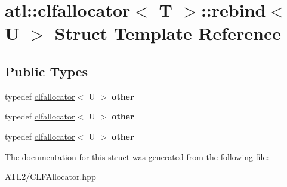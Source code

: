 \hypertarget{structatl_1_1clfallocator_1_1rebind}{\section{atl\+:\+:clfallocator$<$ T $>$\+:\+:rebind$<$ U $>$ Struct Template Reference}
\label{structatl_1_1clfallocator_1_1rebind}
}
\subsection*{Public Types}
\begin{DoxyCompactItemize}
\item 
\hypertarget{structatl_1_1clfallocator_1_1rebind_a52f6f39a2160324b3f2dc0caf40766e2}{typedef \hyperlink{structatl_1_1clfallocator}{clfallocator}$<$ U $>$ {\bfseries other}}\label{structatl_1_1clfallocator_1_1rebind_a52f6f39a2160324b3f2dc0caf40766e2}

\item 
\hypertarget{structatl_1_1clfallocator_1_1rebind_a52f6f39a2160324b3f2dc0caf40766e2}{typedef \hyperlink{structatl_1_1clfallocator}{clfallocator}$<$ U $>$ {\bfseries other}}\label{structatl_1_1clfallocator_1_1rebind_a52f6f39a2160324b3f2dc0caf40766e2}

\item 
\hypertarget{structatl_1_1clfallocator_1_1rebind_a52f6f39a2160324b3f2dc0caf40766e2}{typedef \hyperlink{structatl_1_1clfallocator}{clfallocator}$<$ U $>$ {\bfseries other}}\label{structatl_1_1clfallocator_1_1rebind_a52f6f39a2160324b3f2dc0caf40766e2}

\end{DoxyCompactItemize}


The documentation for this struct was generated from the following file\+:\begin{DoxyCompactItemize}
\item 
A\+T\+L2/C\+L\+F\+Allocator.\+hpp\end{DoxyCompactItemize}
